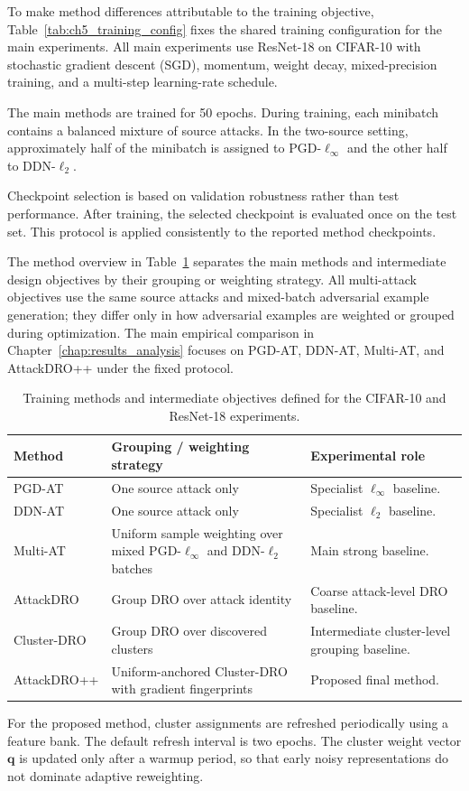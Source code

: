 To make method differences attributable to the training objective, Table~\ref{tab:ch5_training_config}
fixes the shared training configuration for the main experiments. All main experiments use ResNet-18 on CIFAR-10 with stochastic gradient descent (SGD),
momentum, weight decay, mixed-precision training, and a multi-step learning-rate
schedule. 

The main methods are trained for 50 epochs. During training, each minibatch
contains a balanced mixture of source attacks. In the two-source setting, approximately
half of the minibatch is assigned to PGD-\(\ell_\infty\) and the other half to
DDN-\(\ell_2\).


Checkpoint selection is based on validation robustness rather than test performance.
After training, the selected checkpoint is evaluated once on the test set. This protocol
is applied consistently to the reported method checkpoints.

The method overview in Table~\ref{tab:ch5_method_training_summary} separates the
main methods and intermediate design objectives by their grouping or weighting
strategy. All multi-attack objectives use the same source attacks and mixed-batch
adversarial example generation; they differ only in how adversarial examples are
weighted or grouped during optimization. The main empirical comparison in
Chapter~\ref{chap:results_analysis} focuses on PGD-AT, DDN-AT, Multi-AT, and
AttackDRO++ under the fixed protocol.

\begin{table}[H]
\centering
\caption{Training methods and intermediate objectives defined for the CIFAR-10 and ResNet-18 experiments.}
\label{tab:ch5_method_training_summary}
\footnotesize
\setlength{\tabcolsep}{4pt}
\renewcommand{\arraystretch}{1.08}
\begin{tabularx}{\textwidth}{@{}
>{\raggedright\arraybackslash}p{}
>{\raggedright\arraybackslash}p{}
>{\raggedright\arraybackslash}X
@{}}
\toprule
Method & Grouping / weighting strategy & Experimental role \\
\midrule
PGD-AT
& One source attack only
& Specialist $\ell_\infty$ baseline. \\

DDN-AT
& One source attack only
& Specialist $\ell_2$ baseline. \\

Multi-AT
& Uniform sample weighting over mixed PGD-$\ell_\infty$ and DDN-$\ell_2$ batches
& Main strong baseline. \\

AttackDRO
& Group DRO over attack identity
& Coarse attack-level DRO baseline. \\

Cluster-DRO
& Group DRO over discovered clusters
& Intermediate cluster-level grouping baseline. \\

AttackDRO++
& Uniform-anchored Cluster-DRO with gradient fingerprints
& Proposed final method. \\
\bottomrule
\end{tabularx}
\end{table}

For the proposed method, cluster assignments are refreshed periodically using a feature
bank. The default refresh interval is two epochs. The cluster weight vector
\(\mathbf{q}\) is updated only after a warmup period, so that early noisy representations
do not dominate adaptive reweighting.
